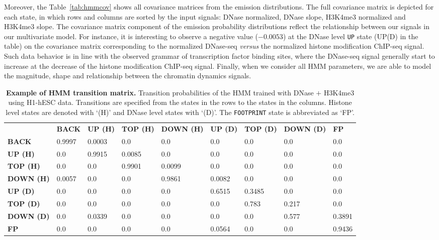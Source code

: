 Moreover, the Table~\ref{tab:hmmcov} shows all covariance matrices from the emission distributions. The full covariance matrix is depicted for each state, in which rows and columns are sorted by the input signals: DNase normalized, DNase slope, H3K4me3 normalized and H3K4me3 slope. The covariance matrix component of the emission probability distributions reflect the relationship between our signals in our multivariate model. For instance, it is interesting to observe a negative value ($-0.0053$) at the DNase level {\tt UP} state (UP(D) in the table) on the covariance matrix corresponding to the normalized DNase-seq \emph{versus} the normalized histone modification ChIP-seq signal. Such data behavior is in line with the observed grammar of transcription factor binding sites, where the DNase-seq signal generally start to increase at the decrease of the histone modification ChIP-seq signal. Finally, when we consider all HMM parameters, we are able to model the magnitude, shape and relationship between the chromatin dynamics signals.

\begin{table}[t]
\footnotesize
\begin{center}
\caption[Example of HMM transition matrix]{\textbf{Example of HMM transition matrix.} Transition probabilities of the HMM trained with DNase $+$ H3K4me3 using H1-hESC data. Transitions are specified from the states in the rows to the states in the columns. Histone level states are denoted with `(H)' and DNase level states with `(D)'. The {\tt FOOTPRINT} state is abbreviated as `FP'.}
\label{tab:hmmtrans}
    \renewcommand{\arraystretch}{1.2}
    \begin{tabular}{ lllllllll }
        \hline
        & \textbf{BACK} & \textbf{UP (H)} & \textbf{TOP (H)} & \textbf{DOWN (H)} & \textbf{UP (D)}
        & \textbf{TOP (D)} & \textbf{DOWN (D)} & \textbf{FP} \\
        \textbf{BACK}     & 0.9997 & 0.0003 & 0.0    & 0.0    & 0.0    & 0.0    & 0.0   & 0.0    \\
        \textbf{UP (H)}   & 0.0    & 0.9915 & 0.0085 & 0.0    & 0.0    & 0.0    & 0.0   & 0.0    \\
        \textbf{TOP (H)}  & 0.0    & 0.0    & 0.9901 & 0.0099 & 0.0    & 0.0    & 0.0   & 0.0    \\
        \textbf{DOWN (H)} & 0.0057 & 0.0    & 0.0    & 0.9861 & 0.0082 & 0.0    & 0.0   & 0.0    \\
        \textbf{UP (D)}   & 0.0    & 0.0    & 0.0    & 0.0    & 0.6515 & 0.3485 & 0.0   & 0.0    \\
        \textbf{TOP (D)}  & 0.0    & 0.0    & 0.0    & 0.0    & 0.0    & 0.783  & 0.217 & 0.0    \\
        \textbf{DOWN (D)} & 0.0    & 0.0339 & 0.0    & 0.0    & 0.0    & 0.0    & 0.577 & 0.3891 \\
        \textbf{FP}       & 0.0    & 0.0    & 0.0    & 0.0    & 0.0564 & 0.0    & 0.0   & 0.9436 \\
        \hline
    \end{tabular}
\end{center}
\end{table}


